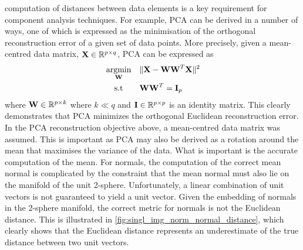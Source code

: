 computation of distances between data elements is a key requirement for
component analysis techniques. For example, PCA can be derived in a number of
ways, one of which is expressed as the minimisation of the orthogonal 
reconstruction error of a given set of data points. More precisely, given
a mean-centred data matrix, $\boldsymbol{\mathbf{X}} \in \mathbb{R}^{p \times q}$, PCA can be expressed 
as
\begin{equation*}
\begin{alignedat}{2}
	&\argmin_{\bb{W}} \quad &&\lVert \bb{X} - \bb{W} \bb{W}^T \bb{X} \rVert^2 \\
	&\quad \, \st      &&\bb{W} \bb{W}^T = \bb{I}_p
\end{alignedat}
\end{equation*}
where $\boldsymbol{\mathbf{W}} \in \mathbb{R}^{p \times k}$ where $k \ll q$ and
$\boldsymbol{\mathbf{I}} \in \mathbb{R}^{p \times p}$ is an identity matrix. This clearly demonstrates
that PCA minimizes the orthogonal Euclidean reconstruction error. In the PCA
reconstruction objective above, a mean-centred data matrix was assumed. This is
important as PCA may also be derived as a rotation around the mean that
maximises the variance of the data. What is important is the accurate
computation of the mean. For normals, the computation of the correct mean normal
is complicated by the constraint that the mean normal must also lie on the
manifold of the unit 2-sphere. Unfortunately, a linear combination of unit
vectors is not guaranteed to yield a unit vector. Given the embedding of normals
in the 2-sphere manifold, the correct metric for normals is not the Euclidean
distance. This is illustrated in
\cref{fig:singl_img_norm_normal_distance}, which clearly shows that the Euclidean
distance represents an underestimate of the true distance between two unit
vectors.
